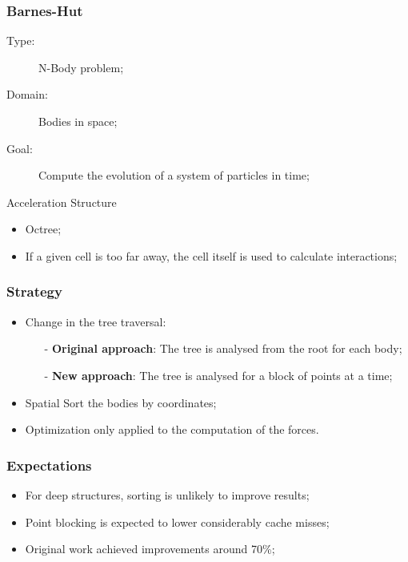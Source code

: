 \begin{frame}
	\frametitle{Barnes-Hut}
	\vfill
	\begin{description}
		\item[Type:] N-Body problem;
		\item[Domain:] Bodies in space;
		\item[Goal:] Compute the evolution of a system of particles in time;
	\end{description}
	\vfill
	\begin{block}{Acceleration Structure}
		\begin{itemize}
			\item Octree;
			\item If a given cell is too far away, the cell itself is used to calculate interactions;
		\end{itemize}
	\end{block}
	\vfill
\end{frame}

\begin{frame}
	\frametitle{Strategy}
	\begin{itemize}\itemsep=20pt
		\item Change in the tree traversal:
		\begin{itemize}
			\item[-] \textbf{Original approach}: The tree is analysed from the root for each body;
			\item[-] \textbf{New approach}: The tree is analysed for a block of points at a time;
		\end{itemize}
		\item Spatial Sort the bodies by coordinates;
		\item Optimization only applied to the computation of the forces.
	\end{itemize}
\end{frame}

\begin{frame}
	\frametitle{Expectations}
	\begin{itemize}\itemsep=20pt
		\item For deep structures, sorting is unlikely to improve results;
		\item Point blocking is expected to lower considerably cache misses;
		\item Original work achieved improvements around 70\%;
	\end{itemize}
\end{frame}
